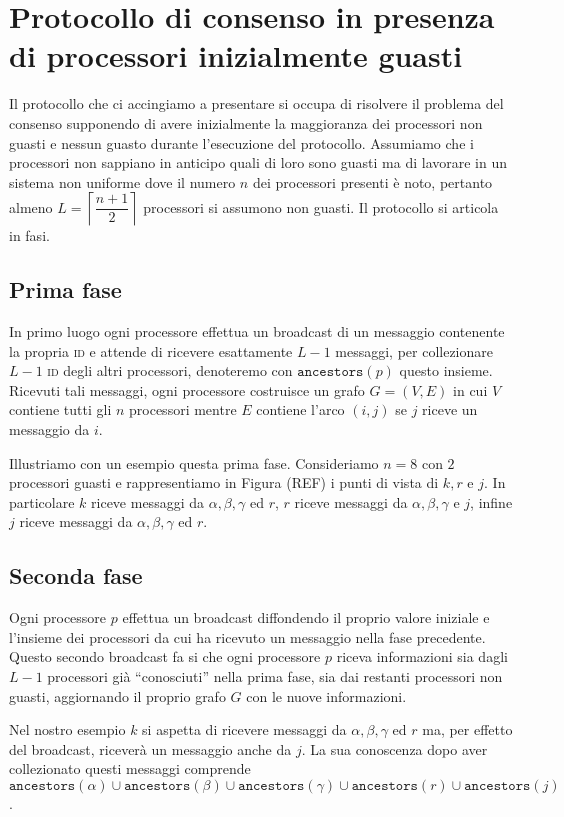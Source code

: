 \documentclass{article}
\begin{document}
\section{Protocollo di consenso in presenza di processori inizialmente guasti}

Il protocollo che ci accingiamo a presentare si occupa di risolvere il
problema del consenso supponendo di avere inizialmente la maggioranza
dei processori non guasti e nessun guasto durante l'esecuzione del
protocollo. Assumiamo che i processori non sappiano in anticipo quali
di loro sono guasti ma di lavorare in un sistema non uniforme dove il
numero $n$ dei processori presenti è noto, pertanto almeno
$L=\left\lceil\dfrac{n+1}{2}\right\rceil$ processori si assumono non
guasti. Il protocollo si articola in fasi.

\subsection{Prima fase}
In primo luogo ogni processore effettua un broadcast di un messaggio
contenente la propria \textsc{id} e attende di ricevere esattamente
$L-1$ messaggi, per collezionare $L-1$ \textsc{id} degli altri
processori, denoteremo con $\texttt{ancestors}(p)$ questo
insieme. Ricevuti tali messaggi, ogni processore costruisce un grafo
$G=(V,E)$ in cui $V$ contiene tutti gli $n$ processori mentre $E$
contiene l'arco $(i,j)$ se $j$ riceve un messaggio da $i$.

Illustriamo con un esempio questa prima fase. Consideriamo $n=8$ con
$2$ processori guasti e rappresentiamo in Figura (REF) i punti di
vista di $k,r$ e $j$. In particolare $k$ riceve messaggi da $\alpha,
\beta, \gamma$ ed $r$, $r$ riceve messaggi da $\alpha, \beta, \gamma$
e $j$, infine $j$ riceve messaggi da $\alpha, \beta, \gamma$ ed $r$.

\subsection{Seconda fase}
Ogni processore $p$ effettua un broadcast diffondendo il proprio
valore iniziale e l'insieme dei processori da cui ha ricevuto un
messaggio nella fase precedente. Questo secondo broadcast fa si che
ogni processore $p$ riceva informazioni sia dagli $L-1$ processori già
``conosciuti'' nella prima fase, sia dai restanti processori non
guasti, aggiornando il proprio grafo $G$ con le nuove informazioni.

Nel nostro esempio $k$ si aspetta di ricevere messaggi da $\alpha,
\beta, \gamma$ ed $r$ ma, per effetto del broadcast, riceverà un
messaggio anche da $j$. La sua conoscenza dopo aver collezionato
questi messaggi comprende
$\texttt{ancestors}(\alpha)\cup\texttt{ancestors}(\beta)\cup\texttt{ancestors}(\gamma)\cup\texttt{ancestors}(r)\cup\texttt{ancestors}(j)$.
\end{document}
